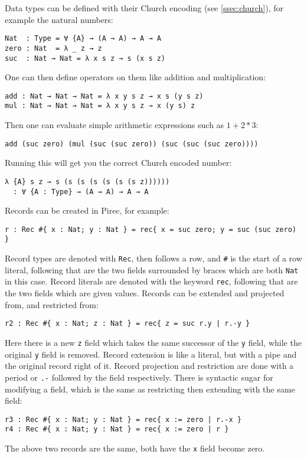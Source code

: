 Data types can be defined with their Church encoding (see \cref{ssec:church}),
for example the natural numbers:
\begin{verbatim}
Nat  : Type = ∀ {A} → (A → A) → A → A
zero : Nat  = λ _ z → z
suc  : Nat → Nat = λ x s z → s (x s z)
\end{verbatim}
One can then define operators on them like addition and multiplication:
\begin{verbatim}
add : Nat → Nat → Nat = λ x y s z → x s (y s z)
mul : Nat → Nat → Nat = λ x y s z → x (y s) z
\end{verbatim}
Then one can evaluate simple arithmetic expressions such as \(1 + 2 * 3\):
\begin{verbatim}
add (suc zero) (mul (suc (suc zero)) (suc (suc (suc zero))))
\end{verbatim}
Running this will get you the correct Church encoded number:
\begin{verbatim}
λ {A} s z → s (s (s (s (s (s (s z))))))
  : ∀ {A : Type} → (A → A) → A → A
\end{verbatim}

Records can be created in Pirec, for example:
\begin{verbatim}
r : Rec #{ x : Nat; y : Nat } = rec{ x = suc zero; y = suc (suc zero) }
\end{verbatim}
Record types are denoted with \texttt{Rec}, then
follows a row, and \texttt{#} is the start of a row
literal, following that are the two fields surrounded by braces which are both
\texttt{Nat} in this case. Record literals are
denoted with the keyword \texttt{rec}, following
that are the two fields which are given values. Records can be extended and
projected from, and restricted from:
\begin{verbatim}
r2 : Rec #{ x : Nat; z : Nat } = rec{ z = suc r.y | r.-y }
\end{verbatim}
Here there is a new \texttt{z} field which takes the
same successor of the \texttt{y} field, while the
original \texttt{y} field is removed. Record
extension is like a literal, but with a pipe and the original record right of
it. Record projection and restriction are done with a period or
\texttt{.-} followed by the field respectively.
There is syntactic sugar for modifying a field, which is the same as restricting then extending with the same field:
\begin{verbatim}
r3 : Rec #{ x : Nat; y : Nat } = rec{ x := zero | r.-x }
r4 : Rec #{ x : Nat; y : Nat } = rec{ x := zero | r }
\end{verbatim}
The above two records are the same, both have the
\texttt{x} field become zero.

